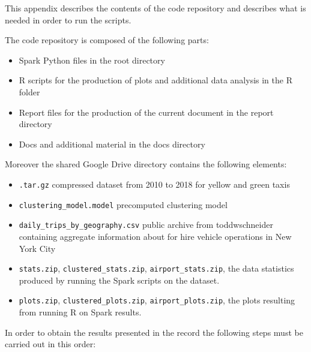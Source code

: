 \documentclass{acm_proc_article-sp-sigmod09}
\begin{document}
This appendix describes the contents of the code repository and describes what is needed in order to run the scripts.

The code repository is composed of the following parts:

\begin{itemize}
	\item Spark Python files in the root directory
	\item R scripts for the production of plots and additional data analysis in the R folder
	\item Report files for the production of the current document in the report directory
	\item Docs and additional material in the docs directory
\end{itemize}

Moreover the shared Google Drive directory contains the following elements:

\begin{itemize}
	\item \texttt{.tar.gz} compressed dataset from 2010 to 2018 for yellow and green taxis 
	\item \texttt{clustering\_model.model} precomputed clustering model
	\item \texttt{daily\_trips\_by\_geography.csv} public archive from toddwschneider containing aggregate information about for hire vehicle operations in New York City
	\item \texttt{stats.zip}, \texttt{clustered\_stats.zip}, \texttt{airport\_stats.zip}, the data statistics produced by running the Spark scripts on the dataset.
	\item \texttt{plots.zip}, \texttt{clustered\_plots.zip}, \texttt{airport\_plots.zip}, the plots resulting from running R on Spark results.
\end{itemize}

In order to obtain the results presented in the record the following steps must be carried out in this order:
\end{document}
